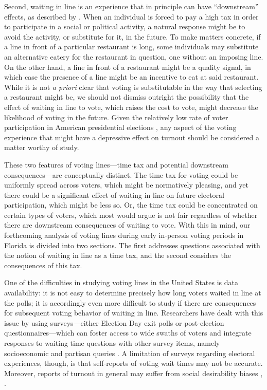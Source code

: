 \documentclass[12pt,titlepage]{article}
\begin{document}
Second, waiting in line is an experience that in principle can have
``downstream'' effects, as described by
\citet{pettigrew:longlinesminorityprecincts}. When an individual is
forced to pay a high tax in order to participate in a social or
political activity, a natural response might be to avoid the activity,
or substitute for it, in the future. To make matters concrete, if a
line in front of a particular restaurant is long, some individuals may
substitute an alternative eatery for the restaurant in question, one
without an imposing line.  On the other hand, a line in front of a
restaurant might be a quality signal, in which case the presence of a
line might be an incentive to eat at said restaurant.  While it is not
\emph{a priori} clear that voting is substitutable in the way that
selecting a restaurant might be, we should not dismiss outright the
possibility that the effect of waiting in line to vote, which raises
the cost to vote, might decrease the likelihood of voting in the
future.  Given the relatively low rate of voter participation in
American presidential elections \citep{IDEA:turnout}, any aspect of
the voting experience that might have a depressive effect on turnout
should be considered a matter worthy of study.


These two features of voting lines---time tax and potential downstream
consequences---are conceptually distinct. The time tax for voting
could be uniformly spread across voters, which might be normatively
pleasing, and yet there could be a significant effect of waiting in
line on future electoral participation, which might be less so. Or,
the time tax could be concentrated on certain types of voters, which
most would argue is not fair regardless of whether there are
downstream consequences of waiting to vote. With this in mind, our
forthcoming analysis of voting lines during early in-person voting
periods in Florida is divided into two sections. The first addresses
questions associated with the notion of waiting in line as a time tax,
and the second considers the consequences of this tax.

One of the difficulties in studying voting lines in the United States
is data availability: it is not easy to determine precisely how long
voters waited in line at the polls; it is accordingly even more
difficult to study if there are consequences for subsequent voting
behavior of waiting in line.  Researchers have dealt with this issue
by using surveys---either Election Day exit polls or post-election
questionnaires---which can foster access to wide swaths of voters and
integrate responses to waiting time questions with other survey items,
namely socioeconomic and partisan queries
\citep{stewart:waitingtovote2012}.  A limitation of surveys regarding
electoral experiences, though, is that self-reports of voting wait
times may not be accurate.  Moreover, reports of turnout in general
may suffer from social desirability biases
\citep{karpbrockington:overreport}, \citep{bellietal:overreport}.
\end{document}
